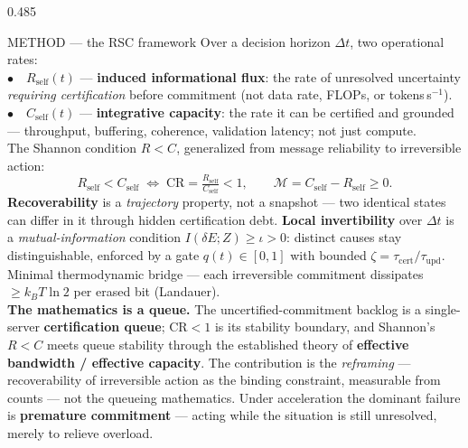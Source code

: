 \documentclass[final]{beamer}
\newcommand{\Rself}{R_{\mathrm{self}}}
\newcommand{\Cself}{C_{\mathrm{self}}}
\newlength{\colh}\setlength{\colh}{74cm}   %
\begin{document}
\begin{frame}[t]{}
\begin{columns}[t,totalwidth=\textwidth]
\begin{column}{0.485\textwidth}
\begin{minipage}[t][\colh][t]{\linewidth}
\begin{rblock}{METHOD --- the RSC framework}
Over a decision horizon $\Delta t$, two operational rates:\\[1.5mm]
$\bullet$\ \ $\Rself(t)$ --- \textbf{induced informational flux}: the rate of unresolved uncertainty \emph{requiring certification} before commitment (not data rate, FLOPs, or tokens\,s$^{-1}$).\\[1.5mm]
$\bullet$\ \ $\Cself(t)$ --- \textbf{integrative capacity}: the rate it can be certified and grounded --- throughput, buffering, coherence, validation latency; not just compute.\\[3mm]
The Shannon condition $R<C$, generalized from message reliability to irreversible action:
{\color{rscblue}\[ \Rself < \Cself \;\Longleftrightarrow\; \mathrm{CR}=\tfrac{\Rself}{\Cself}<1, \qquad \mathcal{M}=\Cself-\Rself\ge 0. \]}
\textbf{Recoverability} is a \emph{trajectory} property, not a snapshot --- two identical states can differ in it through hidden certification debt. \textbf{Local invertibility} over $\Delta t$ is a \emph{mutual-information} condition $I(\delta E; Z)\ge\iota>0$: distinct causes stay distinguishable, enforced by a gate $q(t)\in[0,1]$ with bounded $\zeta=\tau_{\mathrm{cert}}/\tau_{\mathrm{upd}}$. Minimal thermodynamic bridge --- each irreversible commitment dissipates $\ge k_BT\ln 2$ per erased bit (Landauer).\\[3mm]
{\color{rscblue}\bfseries The mathematics is a queue.} The uncertified-commitment backlog is a single-server \textbf{certification queue}; $\mathrm{CR}<1$ is its stability boundary, and Shannon's $R<C$ meets queue stability through the established theory of \textbf{effective bandwidth / effective capacity}. The contribution is the \emph{reframing} --- recoverability of irreversible action as the binding constraint, measurable from counts --- not the queueing mathematics. Under acceleration the dominant failure is \textbf{premature commitment} --- acting while the situation is still unresolved, merely to relieve overload.
\end{rblock}

\vfill


\end{minipage}
\end{column}
\end{columns}
\end{frame}
\end{document}
